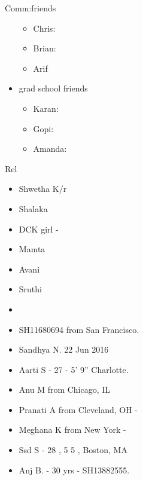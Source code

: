 \documentclass[serif, mathserif, final]{beamer}
\begin{document}
\begin{frame}[label=socialInt]
\begin{block}{Comm:friends}
\begin{itemize}
\begin{itemize}
          \item \tiny Chris: 
          \item \tiny Brian: 
          \item \tiny Arif 
          \end{itemize}
        \item grad school friends 
          \begin{itemize} 
            \tiny \item \tiny  Karan: 
          \item \tiny Gopi: 
          \item \tiny Amanda:  
          \end{itemize}
        \end{itemize} 
      \end{block}
      
      \begin{block}{Rel} 
        \begin{itemize} 
          \small \item \small Shwetha K/r
        \item \small Shalaka 
        \item \tiny DCK girl -
        \item \small Mamta
        \item \small Avani 
        \item \small Sruthi 
          \item \small 
        \item \small SH11680694 from San Francisco. 
        \item \small Sandhya N. 22 Jun 2016 
        \item \small Aarti S - 27 - 5' 9'' Charlotte.       
        \item \small Anu M from Chicago, IL 
        \item \small Pranati A from Cleveland, OH - 
        \item \small Meghana K from New York - 
        \item \small Ssd S - 28 , 5 5 , Boston, MA 
        \item \small Anj B. - 30 yrs - SH13882555.
        \end{itemize}
      \end{block} 

\end{frame}
\end{document}
